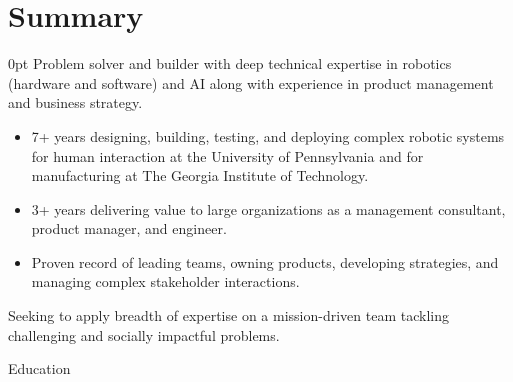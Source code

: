 \documentclass[10pt, letter]{article}
\begin{document}


\section*{Summary}

\begin{adjustwidth}{\cvindent}{0pt}
Problem solver and builder with deep technical expertise in robotics (hardware and software) and AI along with experience in product management and business strategy. 
\begin{itemize}
    \item 7+ years designing, building, testing, and deploying complex robotic systems for human interaction at the University of Pennsylvania and for manufacturing at The Georgia Institute of Technology.
    \item 3+ years delivering value to large organizations as a management consultant, product manager, and engineer.
    \item Proven record of leading teams, owning products, developing strategies, and managing complex stakeholder interactions.
\end{itemize}
    Seeking to apply breadth of expertise on a mission-driven team tackling challenging and socially impactful problems.

\end{adjustwidth}




\begin{cvsection}{Education}




\end{cvsection}
\end{document}
